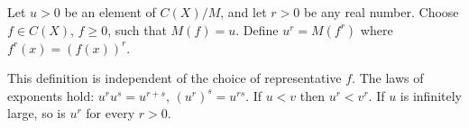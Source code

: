 Let $u > 0$ be an element of $C(X)/M$, and let $r > 0$ be any real number. Choose $f \in C(X)$, $f \geq 0$, such that $M(f) = u$. Define $u^r = M(f^r)$ where $f^r(x) = (f(x))^r$.

This definition is independent of the choice of representative $f$. The laws of exponents hold: $u^r u^s = u^{r+s}$, $(u^r)^s = u^{rs}$. If $u < v$ then $u^r < v^r$. If $u$ is infinitely large, so is $u^r$ for every $r > 0$.
